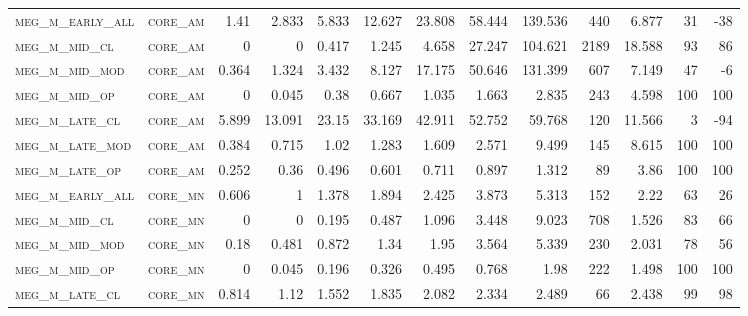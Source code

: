\begin{landscape}
\begin{center}
\begin{footnotesize}
\begin{longtable}{llrrrrrrrr|rrr}
\textsc{meg\_m\_early\_all} & \textsc{core\_am  }   & 1.41     & 2.833    & 5.833    & 12.627   & 23.808   & 58.444   & 139.536   & 440    & 6.877         & 31            & -38             \\
\textsc{meg\_m\_mid\_cl   } & \textsc{core\_am  }   & 0        & 0        & 0.417    & 1.245    & 4.658    & 27.247   & 104.621   & 2189   & 18.588        & 93            & 86              \\
\textsc{meg\_m\_mid\_mod  } & \textsc{core\_am  }   & 0.364    & 1.324    & 3.432    & 8.127    & 17.175   & 50.646   & 131.399   & 607    & 7.149         & 47            & -6              \\
\textsc{meg\_m\_mid\_op   } & \textsc{core\_am  }   & 0        & 0.045    & 0.38     & 0.667    & 1.035    & 1.663    & 2.835     & 243    & 4.598         & 100           & 100             \\
\textsc{meg\_m\_late\_cl  } & \textsc{core\_am  }   & 5.899    & 13.091   & 23.15    & 33.169   & 42.911   & 52.752   & 59.768    & 120    & 11.566        & 3             & -94             \\
\textsc{meg\_m\_late\_mod } & \textsc{core\_am  }   & 0.384    & 0.715    & 1.02     & 1.283    & 1.609    & 2.571    & 9.499     & 145    & 8.615         & 100           & 100             \\
\textsc{meg\_m\_late\_op  } & \textsc{core\_am  }   & 0.252    & 0.36     & 0.496    & 0.601    & 0.711    & 0.897    & 1.312     & 89     & 3.86          & 100           & 100             \\
\textsc{meg\_m\_early\_all} & \textsc{core\_mn  }   & 0.606    & 1        & 1.378    & 1.894    & 2.425    & 3.873    & 5.313     & 152    & 2.22          & 63            & 26              \\
\textsc{meg\_m\_mid\_cl   } & \textsc{core\_mn  }   & 0        & 0        & 0.195    & 0.487    & 1.096    & 3.448    & 9.023     & 708    & 1.526         & 83            & 66              \\
\textsc{meg\_m\_mid\_mod  } & \textsc{core\_mn  }   & 0.18     & 0.481    & 0.872    & 1.34     & 1.95     & 3.564    & 5.339     & 230    & 2.031         & 78            & 56              \\
\textsc{meg\_m\_mid\_op   } & \textsc{core\_mn  }   & 0        & 0.045    & 0.196    & 0.326    & 0.495    & 0.768    & 1.98      & 222    & 1.498         & 100           & 100             \\
\textsc{meg\_m\_late\_cl  } & \textsc{core\_mn  }   & 0.814    & 1.12     & 1.552    & 1.835    & 2.082    & 2.334    & 2.489     & 66     & 2.438         & 99            & 98              \\

\end{longtable}
\end{footnotesize}
\end{center}
\end{landscape}
